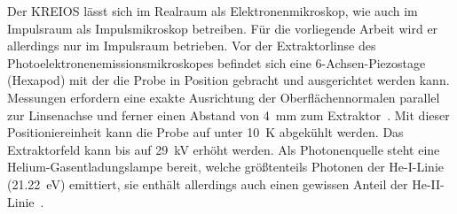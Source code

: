         Der KREIOS lässt sich im Realraum als Elektronenmikroskop, wie auch im Impulsraum als Impulsmikroskop betreiben.
        Für die vorliegende Arbeit wird er allerdings nur im Impulsraum betrieben.
        Vor der Extraktorlinse des Photoelektronenemissionsmikroskopes befindet sich eine 6-Achsen-Piezostage (Hexapod) mit der die Probe in Position gebracht und ausgerichtet werden kann.
        Messungen erfordern eine exakte Ausrichtung der Oberflächennormalen parallel zur Linsenachse und ferner einen Abstand von \SI{4}{\milli\meter} zum Extraktor~\cite{SPECS-MM}.
        Mit dieser Positioniereinheit kann die Probe auf unter \SI{10}{\kelvin} abgekühlt werden.
        Das Extraktorfeld kann bis auf \SI{29}{\kilo\volt} erhöht werden.
        Als Photonenquelle steht eine Helium-Gasentladungslampe bereit, welche größtenteils Photonen der He-I-Linie (\SI{21.22}{\electronvolt}) emittiert, sie enthält allerdings auch einen gewissen Anteil der He-II-Linie~\cite{UVS}.
